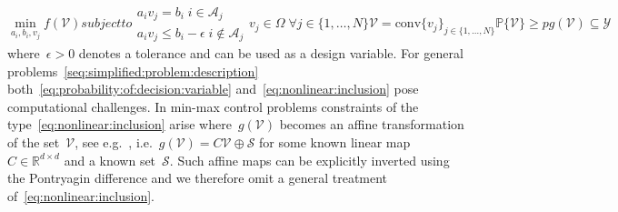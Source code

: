 \documentclass[letterpaper, 10pt, conference]{ieeeconf} %
\providecommand{\conv}{\text{conv}}
\begin{document}
\begin{subequations}\label{seq:simplified:problem:description}
\begin{equation}
	\min_{a_i,b_i,v_j} f(\mathcal V) %
\end{equation}
%
subject to
%
\begin{equation}\begin{aligned}
	a_i v_j=b_i\; i\in\mathcal A_j\\
	a_i v_j\leq b_i-\epsilon \; i\not\in\mathcal A_j
\end{aligned}\end{equation}
%
\begin{equation}
	v_j\in\Omega \;\forall j\in\{1,\dots,N\}
\end{equation}
%
\begin{equation}
	\mathcal V = \conv\{v_j\}_{j\in\{1,\dots,N\}}
\end{equation}
%
\begin{equation}\label{eq:probability:of:decision:variable}
	\mathbb P\{\mathcal V\}\geq p
\end{equation}
%
\begin{equation}\label{eq:nonlinear:inclusion}
	g(\mathcal V)\subseteq\mathcal Y
\end{equation}
\end{subequations}
%
where~$\epsilon>0$ denotes a tolerance and can be used as a design variable.
%
For general problems~\eqref{seq:simplified:problem:description} both~\eqref{eq:probability:of:decision:variable} and~\eqref{eq:nonlinear:inclusion} pose computational challenges.
%
In min-max control problems constraints of the type~\eqref{eq:nonlinear:inclusion} arise where~$g(\mathcal V)$ becomes an affine transformation of the set~$\mathcal V$, see e.g.~\cite{Schaich:2017}, i.e.~$g(\mathcal V) = C\mathcal V\oplus \mathcal S$ for some known linear map~$C\in\mathbb R^{d\times d}$ and a known set~$\mathcal S$. 
%
Such affine maps can be explicitly inverted using the Pontryagin difference and we therefore omit a general treatment of~\eqref{eq:nonlinear:inclusion}.
%
\end{document}
